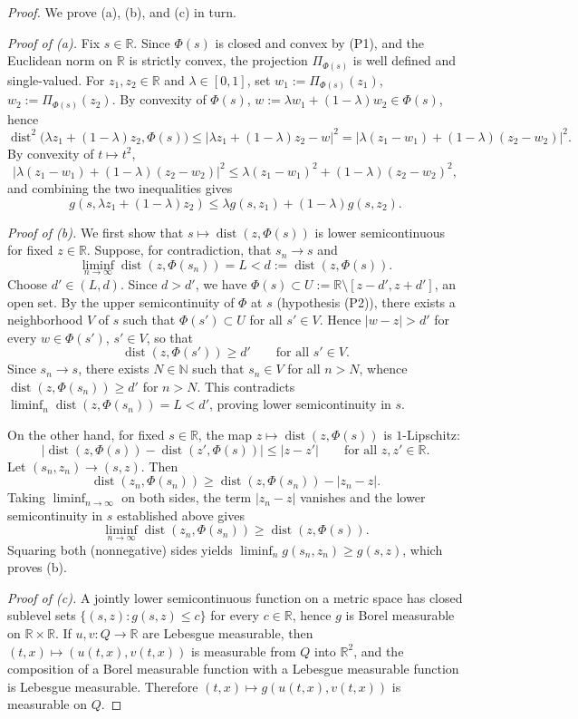 \documentclass[11pt]{elsarticle}
\theoremstyle{definition}
\theoremstyle{remark}
\numberwithin{equation}{section}
\begin{document}
\begin{proof}
	We prove (a), (b), and (c) in turn.
	
	\emph{Proof of (a).} Fix $s\in\mathbb{R}$. Since $\Phi(s)$ is closed and convex
	by (P1), and the Euclidean norm on $\mathbb{R}$ is strictly convex, the
	projection $\Pi_{\Phi(s)}$ is well defined and single-valued. For
	$z_1,z_2\in\mathbb{R}$ and $\lambda\in[0,1]$, set
	$w_1:=\Pi_{\Phi(s)}(z_1)$, $w_2:=\Pi_{\Phi(s)}(z_2)$. By convexity of
	$\Phi(s)$, $w:=\lambda w_1+(1-\lambda)w_2\in\Phi(s)$, hence
	\[
	\operatorname{dist}^2\bigl(\lambda z_1+(1-\lambda)z_2,\Phi(s)\bigr)
	\le |\lambda z_1+(1-\lambda)z_2-w|^2
	= |\lambda(z_1-w_1)+(1-\lambda)(z_2-w_2)|^2.
	\]
	By convexity of $t\mapsto t^2$,
	\[
	|\lambda(z_1-w_1)+(1-\lambda)(z_2-w_2)|^2
	\le \lambda(z_1-w_1)^2+(1-\lambda)(z_2-w_2)^2,
	\]
	and combining the two inequalities gives
	\[
	g(s,\lambda z_1+(1-\lambda)z_2)\le \lambda g(s,z_1)+(1-\lambda)g(s,z_2).
	\]
	
	\emph{Proof of (b).} We first show that $s\mapsto\operatorname{dist}(z,\Phi(s))$
	is lower semicontinuous for fixed $z\in\mathbb{R}$. Suppose, for contradiction,
	that $s_n\to s$ and
	\[
	\liminf_{n\to\infty}\operatorname{dist}(z,\Phi(s_n)) = L < d:=\operatorname{dist}(z,\Phi(s)).
	\]
	Choose $d'\in(L,d)$. Since $d>d'$, we have $\Phi(s)\subset U:=\mathbb{R}\setminus[z-d',z+d']$,
	an open set. By the upper semicontinuity of $\Phi$ at $s$ (hypothesis (P2)),
	there exists a neighborhood $V$ of $s$ such that $\Phi(s')\subset U$ for all
	$s'\in V$. Hence $|w-z|>d'$ for every $w\in\Phi(s')$, $s'\in V$, so that
	\[
	\operatorname{dist}(z,\Phi(s'))\ge d' \qquad \text{for all } s'\in V.
	\]
	Since $s_n\to s$, there exists $N\in\mathbb{N}$ such that $s_n\in V$ for all
	$n>N$, whence $\operatorname{dist}(z,\Phi(s_n))\ge d'$ for $n>N$. This contradicts
	$\liminf_n \operatorname{dist}(z,\Phi(s_n)) = L < d'$, proving lower semicontinuity
	in $s$.
	
	On the other hand, for fixed $s\in\mathbb{R}$, the map
	$z\mapsto\operatorname{dist}(z,\Phi(s))$ is $1$-Lipschitz:
	\[
	\bigl|\operatorname{dist}(z,\Phi(s))-\operatorname{dist}(z',\Phi(s))\bigr|
	\le |z-z'| \qquad \text{for all } z,z'\in\mathbb{R}.
	\]
	Let $(s_n,z_n)\to(s,z)$. Then
	\[
	\operatorname{dist}(z_n,\Phi(s_n)) \ge \operatorname{dist}(z,\Phi(s_n)) - |z_n-z|.
	\]
	Taking $\liminf_{n\to\infty}$ on both sides, the term $|z_n-z|$ vanishes and
	the lower semicontinuity in $s$ established above gives
	\[
	\liminf_{n\to\infty}\operatorname{dist}(z_n,\Phi(s_n)) \ge \operatorname{dist}(z,\Phi(s)).
	\]
	Squaring both (nonnegative) sides yields $\liminf_n g(s_n,z_n)\ge g(s,z)$,
	which proves (b).
	
	\emph{Proof of (c).} A jointly lower semicontinuous function on a metric
	space has closed sublevel sets $\{(s,z):g(s,z)\le c\}$ for every
	$c\in\mathbb{R}$, hence $g$ is Borel measurable on $\mathbb{R}\times\mathbb{R}$.
	If $u,v:Q\to\mathbb{R}$ are Lebesgue measurable, then
	$(t,x)\mapsto(u(t,x),v(t,x))$ is measurable from $Q$ into $\mathbb{R}^2$, and
	the composition of a Borel measurable function with a Lebesgue measurable
	function is Lebesgue measurable. Therefore $(t,x)\mapsto g(u(t,x),v(t,x))$
	is measurable on $Q$.
\end{proof}
	
\end{document}
